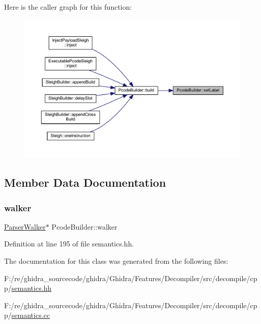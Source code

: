 Here is the caller graph for this function\+:
\nopagebreak
\begin{figure}[H]
\begin{center}
\leavevmode
\includegraphics[width=350pt]{class_pcode_builder_aadc0f772375e7c05ecd11ea145d61df2_icgraph}
\end{center}
\end{figure}


\subsection{Member Data Documentation}
\mbox{\label{class_pcode_builder_af47adb151a448ebd175f638f03d17a28}} 
\subsubsection{\texorpdfstring{walker}{walker}}
{\footnotesize\ttfamily \mbox{\hyperlink{class_parser_walker}{Parser\+Walker}}$\ast$ Pcode\+Builder\+::walker\hspace{0.3cm}{\ttfamily [protected]}}



Definition at line 195 of file semantics.\+hh.



The documentation for this class was generated from the following files\+:\begin{DoxyCompactItemize}
\item 
F\+:/re/ghidra\+\_\+sourcecode/ghidra/\+Ghidra/\+Features/\+Decompiler/src/decompile/cpp/\mbox{\hyperlink{semantics_8hh}{semantics.\+hh}}\item 
F\+:/re/ghidra\+\_\+sourcecode/ghidra/\+Ghidra/\+Features/\+Decompiler/src/decompile/cpp/\mbox{\hyperlink{semantics_8cc}{semantics.\+cc}}\end{DoxyCompactItemize}
